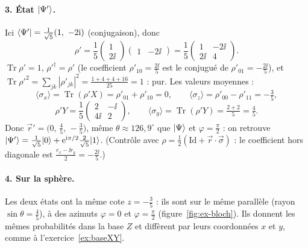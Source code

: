 \begin{correction}
\paragraph{3. État $|\Psi'\rangle$.} Ici $\bra{\Psi'}=\frac{1}{\sqrt5}(1,\ -2\ii)$ (conjugaison), donc
\[
  \rho'=\frac15\begin{pmatrix}1\\2\ii\end{pmatrix}\begin{pmatrix}1&-2\ii\end{pmatrix}
  =\frac15\begin{pmatrix}1&-2\ii\\2\ii&4\end{pmatrix}.
\]
$\operatorname{Tr}\rho'=1$, $\rho'^\dagger=\rho'$ (le coefficient $\rho'_{10}=\frac{2\ii}5$ est le
conjugué de $\rho'_{01}=-\frac{2\ii}5$), et $\operatorname{Tr}\rho'^2=\sum_{jk}|\rho'_{jk}|^2=\frac{1+4+4+16}{25}=1$ :
pur. Les valeurs moyennes :
\[
  \langle\sigma_x\rangle=\operatorname{Tr}(\rho'X)=\rho'_{01}+\rho'_{10}=0,\qquad
  \langle\sigma_z\rangle=\rho'_{00}-\rho'_{11}=-\tfrac35,
\]
\[
  \rho'Y=\frac15\begin{pmatrix}2&-\ii\\4\ii&2\end{pmatrix},\qquad
  \langle\sigma_y\rangle=\operatorname{Tr}(\rho'Y)=\tfrac{2+2}{5}=\tfrac45 .
\]
Donc $\vec r'=\big(0,\,\tfrac45,\,-\tfrac35\big)$, même $\theta\approx126{,}9^\circ$ que
$|\Psi\rangle$ et $\varphi=\frac\pi2$ : on retrouve $|\Psi'\rangle=\frac{1}{\sqrt5}|0\rangle+\mathrm{e}^{\mathrm{i}\pi/2}\frac{2}{\sqrt5}|1\rangle$.
(Contrôle avec $\rho=\frac12(\mathrm{Id}+\vec r\cdot\vec\sigma)$ : le coefficient hors diagonale est
$\frac{r_x-\ii r_y}{2}=-\frac{2\ii}{5}$.)

\paragraph{4. Sur la sphère.} Les deux états ont la même cote $z=-\frac35$ : ils sont sur le même
parallèle (rayon $\sin\theta=\frac45$), à des azimuts $\varphi=0$ et $\varphi=\frac\pi2$
(figure~\ref{fig:ex-bloch}). Ils donnent les mêmes probabilités dans la base $Z$ et diffèrent par
leurs coordonnées $x$ et $y$, comme à l'exercice~\ref{ex:baseXY}.


\end{correction}
